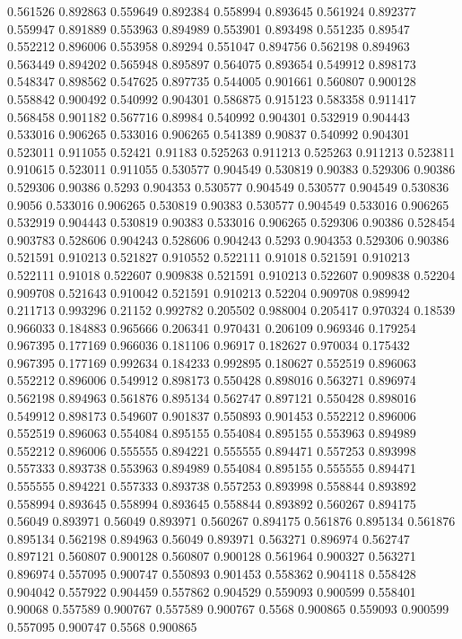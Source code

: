 0.561526 0.892863
0.559649 0.892384
0.558994 0.893645
0.561924 0.892377
0.559947 0.891889
0.553963 0.894989
0.553901 0.893498
0.551235 0.89547
0.552212 0.896006
0.553958 0.89294
0.551047 0.894756
0.562198 0.894963
0.563449 0.894202
0.565948 0.895897
0.564075 0.893654
0.549912 0.898173
0.548347 0.898562
0.547625 0.897735
0.544005 0.901661
0.560807 0.900128
0.558842 0.900492
0.540992 0.904301
0.586875 0.915123
0.583358 0.911417
0.568458 0.901182
0.567716 0.89984
0.540992 0.904301
0.532919 0.904443
0.533016 0.906265
0.533016 0.906265
0.541389 0.90837
0.540992 0.904301
0.523011 0.911055
0.52421 0.91183
0.525263 0.911213
0.525263 0.911213
0.523811 0.910615
0.523011 0.911055
0.530577 0.904549
0.530819 0.90383
0.529306 0.90386
0.529306 0.90386
0.5293 0.904353
0.530577 0.904549
0.530577 0.904549
0.530836 0.9056
0.533016 0.906265
0.530819 0.90383
0.530577 0.904549
0.533016 0.906265
0.532919 0.904443
0.530819 0.90383
0.533016 0.906265
0.529306 0.90386
0.528454 0.903783
0.528606 0.904243
0.528606 0.904243
0.5293 0.904353
0.529306 0.90386
0.521591 0.910213
0.521827 0.910552
0.522111 0.91018
0.521591 0.910213
0.522111 0.91018
0.522607 0.909838
0.521591 0.910213
0.522607 0.909838
0.52204 0.909708
0.521643 0.910042
0.521591 0.910213
0.52204 0.909708
0.989942 0.211713
0.993296 0.21152
0.992782 0.205502
0.988004 0.205417
0.970324 0.18539
0.966033 0.184883
0.965666 0.206341
0.970431 0.206109
0.969346 0.179254
0.967395 0.177169
0.966036 0.181106
0.96917 0.182627
0.970034 0.175432
0.967395 0.177169
0.992634 0.184233
0.992895 0.180627
0.552519 0.896063
0.552212 0.896006
0.549912 0.898173
0.550428 0.898016
0.563271 0.896974
0.562198 0.894963
0.561876 0.895134
0.562747 0.897121
0.550428 0.898016
0.549912 0.898173
0.549607 0.901837
0.550893 0.901453
0.552212 0.896006
0.552519 0.896063
0.554084 0.895155
0.554084 0.895155
0.553963 0.894989
0.552212 0.896006
0.555555 0.894221
0.555555 0.894471
0.557253 0.893998
0.557333 0.893738
0.553963 0.894989
0.554084 0.895155
0.555555 0.894471
0.555555 0.894221
0.557333 0.893738
0.557253 0.893998
0.558844 0.893892
0.558994 0.893645
0.558994 0.893645
0.558844 0.893892
0.560267 0.894175
0.56049 0.893971
0.56049 0.893971
0.560267 0.894175
0.561876 0.895134
0.561876 0.895134
0.562198 0.894963
0.56049 0.893971
0.563271 0.896974
0.562747 0.897121
0.560807 0.900128
0.560807 0.900128
0.561964 0.900327
0.563271 0.896974
0.557095 0.900747
0.550893 0.901453
0.558362 0.904118
0.558428 0.904042
0.557922 0.904459
0.557862 0.904529
0.559093 0.900599
0.558401 0.90068
0.557589 0.900767
0.557589 0.900767
0.5568 0.900865
0.559093 0.900599
0.557095 0.900747
0.5568 0.900865
